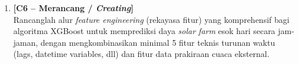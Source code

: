 \documentclass[11pt,a4paper]{article}
\begin{document}
\begin{enumerate}[leftmargin=1.8em, label=\textbf{Soal \arabic*.}]
    \item \textbf{[C6 -- Merancang / \textit{Creating}]} \\
    Rancanglah alur \textit{feature engineering} (rekayasa fitur) yang komprehensif bagi algoritma XGBoost untuk memprediksi daya \textit{solar farm} esok hari secara jam-jaman, dengan mengkombinasikan minimal 5 fitur teknis turunan waktu (lags, datetime variables, dll) dan fitur data prakiraan cuaca eksternal.
    \vspace{4.5cm}

\end{enumerate}
\end{document}
